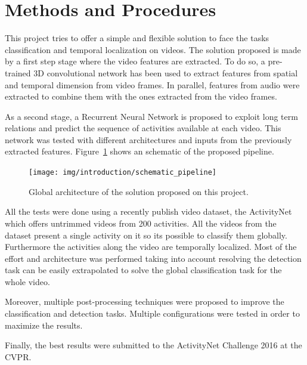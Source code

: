 
\section{Methods and Procedures}

This project tries to offer a simple and flexible solution to face the tasks classification and temporal localization on videos. The solution proposed is made by a first step stage where the video features are extracted. To do so, a pre-trained 3D convolutional network has been used to extract features from spatial and temporal dimension from video frames. In parallel, features from audio were extracted to combine them with the ones extracted from the video frames.

As a second stage, a Recurrent Neural Network is proposed to exploit long term relations and predict the sequence of activities available at each video. This network was tested with different architectures and inputs from the previously extracted features. Figure~\ref{fig:global_pipeline} shows an schematic of the proposed pipeline.

\begin{figure}[ht]
\begin{center}
\texttt{[image: img/introduction/schematic\_pipeline]}
\end{center}
\caption{Global architecture of the solution proposed on this project.}
\label{fig:global_pipeline}
\end{figure}

All the tests were done using a recently publish video dataset, the ActivityNet\cite{caba2015activitynet} which offers untrimmed videos from 200 activities. All the videos from the dataset present a single activity on it so its possible to classify them globally. Furthermore the activities along the video are temporally localized. Most of the effort and architecture was performed taking into account resolving the detection task can be easily extrapolated to solve the global classification task for the whole video.

Moreover, multiple post-processing techniques were proposed to improve the classification and detection tasks. Multiple configurations were tested in order to maximize the results.

Finally, the best results were submitted to the ActivityNet Challenge 2016 at the CVPR.

